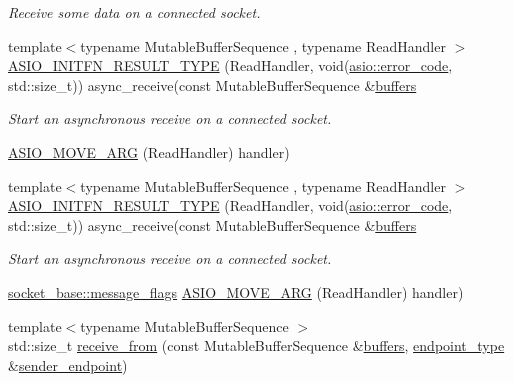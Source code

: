 \begin{DoxyCompactItemize}
\begin{DoxyCompactList}\small\item\em Receive some data on a connected socket. \end{DoxyCompactList}\item 
{\footnotesize template$<$typename Mutable\+Buffer\+Sequence , typename Read\+Handler $>$ }\\\hyperlink{classasio_1_1basic__raw__socket_ad04fc96736373909be039880d82ad3b0}{A\+S\+I\+O\+\_\+\+I\+N\+I\+T\+F\+N\+\_\+\+R\+E\+S\+U\+L\+T\+\_\+\+T\+Y\+P\+E} (Read\+Handler, void(\hyperlink{classasio_1_1error__code}{asio\+::error\+\_\+code}, std\+::size\+\_\+t)) async\+\_\+receive(const Mutable\+Buffer\+Sequence \&\hyperlink{group__async__read_ga54dede45c3175148a77fe6635222c47d}{buffers}
\begin{DoxyCompactList}\small\item\em Start an asynchronous receive on a connected socket. \end{DoxyCompactList}\item 
\hyperlink{classasio_1_1basic__raw__socket_ae12375217b3a5ecbb9ae5ff0a9ad6bbc}{A\+S\+I\+O\+\_\+\+M\+O\+V\+E\+\_\+\+A\+R\+G} (Read\+Handler) handler)
\item 
{\footnotesize template$<$typename Mutable\+Buffer\+Sequence , typename Read\+Handler $>$ }\\\hyperlink{classasio_1_1basic__raw__socket_ad04fc96736373909be039880d82ad3b0}{A\+S\+I\+O\+\_\+\+I\+N\+I\+T\+F\+N\+\_\+\+R\+E\+S\+U\+L\+T\+\_\+\+T\+Y\+P\+E} (Read\+Handler, void(\hyperlink{classasio_1_1error__code}{asio\+::error\+\_\+code}, std\+::size\+\_\+t)) async\+\_\+receive(const Mutable\+Buffer\+Sequence \&\hyperlink{group__async__read_ga54dede45c3175148a77fe6635222c47d}{buffers}
\begin{DoxyCompactList}\small\item\em Start an asynchronous receive on a connected socket. \end{DoxyCompactList}\item 
\hyperlink{classasio_1_1socket__base_ac3cf77465dfedfe1979b5415cf32cc94}{socket\+\_\+base\+::message\+\_\+flags} \hyperlink{classasio_1_1basic__raw__socket_a7cc111355781d37c8abc59d40caf6170}{A\+S\+I\+O\+\_\+\+M\+O\+V\+E\+\_\+\+A\+R\+G} (Read\+Handler) handler)
\item 
{\footnotesize template$<$typename Mutable\+Buffer\+Sequence $>$ }\\std\+::size\+\_\+t \hyperlink{classasio_1_1basic__raw__socket_a4de1a11e85b9742f75d35020f810126c}{receive\+\_\+from} (const Mutable\+Buffer\+Sequence \&\hyperlink{group__async__read_ga54dede45c3175148a77fe6635222c47d}{buffers}, \hyperlink{classasio_1_1basic__raw__socket_a75803815223ab2cbfa66c51a650236b5}{endpoint\+\_\+type} \&\hyperlink{classasio_1_1basic__raw__socket_aa2e1f2e9f86892704225b64abe99c528}{sender\+\_\+endpoint})

\end{DoxyCompactItemize}
